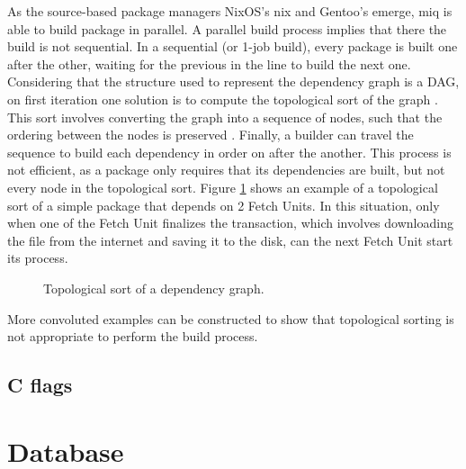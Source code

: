 As the source-based package managers NixOS's nix and
Gentoo's emerge, miq is able to build package in parallel. A
parallel build process implies that there the build is not
sequential. In a sequential (or 1-job build), every package
is built one after the other, waiting for the previous in
the line to build the next one. Considering that the
structure used to represent the dependency graph is a
\acl{DAG}, on first iteration one solution is to compute the
topological sort of the graph
 . This sort
involves converting the graph into a sequence of nodes, such
that the ordering between the nodes is preserved
\cite{erParallelComputationApproach1983} . Finally, a
builder can travel the sequence to build each dependency in
order on after the another.
This process is not efficient, as a package only requires
that its dependencies are built, but not every node in the
topological sort. Figure \ref{fig:toposort} shows an example
of a topological sort of a simple package that depends on 2
Fetch Units. In this situation, only when one of the Fetch
Unit finalizes the transaction, which involves downloading
the file from the internet and saving it to the disk, can
the next Fetch Unit start its process.

\begin{figure}[hbt]
    \centerfloat
    
    \caption{Topological sort of a dependency graph.}
    \label{fig:toposort}
\end{figure}

More convoluted examples can be constructed to show that
topological sorting is not appropriate to perform the build process.

\subsection{C flags}

\section{Database}
